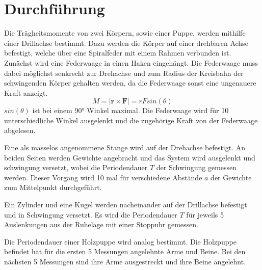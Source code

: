 \section{Durchführung}
\label{sec:Durchführung}
Die Trägheitsmomente von zwei Körpern, sowie einer Puppe, werden mithilfe
einer Drillachse bestimmt. Dazu werden die Körper auf einer drehbaren Achse befestigt,
welche über eine Spiralfeder mit einem Rahmen verbunden ist. Zunächst wird eine Federwaage
in einen Haken eingehängt. Die Federwaage muss dabei möglichst senkrecht zur Drehachse
und zum Radius der Kreisbahn der schwingenden Körper gehalten werden, da
die Federwaage sonst eine ungenauere Kraft anzeigt.
\begin{equation}
  M = |\symbf{r} \times \symbf{F}| = r F sin(\theta)
\end{equation}
$sin(\theta)$ ist bei einem 90° Winkel maximal. Die Federwaage wird für 10 unterschiedliche
Winkel ausgelenkt und die zugehörige Kraft von der Federwaage abgelesen.

Eine als masselos angenommene Stange wird auf der Drehachse befestigt. An beiden
Seiten werden Gewichte angebracht und das System wird ausgelenkt und schwingung
versetzt, wobei die Periodendauer $T$ der Schwingung gemessen werden. Dieser Vorgang
wird 10 mal für verschiedene Abstände $a$ der Gewichte zum Mittelpunkt durchgeführt.

Ein Zylinder und eine Kugel werden nacheinander auf der Drillachse befestigt und
in Schwingung versetzt. Es wird die Periodendauer $T$ für jeweils 5 Auslenkungen
aus der Ruhelage mit einer Stoppuhr gemessen.

Die Periodendauer einer Holzpuppe wird analog bestimmt. Die Holzpuppe befindet
hat für die ersten 5 Messungen angelehnte Arme und Beine. Bei den nächsten 5
Messungen sind ihre Arme ausgestreckt und ihre Beine angelehnt.
